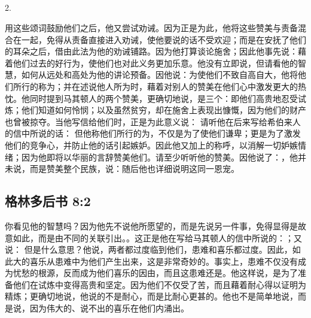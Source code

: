 
\subsection{}

2. \par

用这些颂词鼓励他们之后，他又尝试劝诫。因为正是为此，他将这些赞美与责备混合在一起，免得从责备直接进入劝诫，使他要说的话不受欢迎；而是在安抚了他们的耳朵之后，借由此法为他的劝诫铺路。因为他打算谈论施舍；因此他事先说：藉着他们过去的好行为，使他们也对此义务更加乐意。他没有立即说，但请看他的智慧，如何从远处和高处为他的讲论预备。因他说：为使他们不致自高自大，他将他们所行的称为；并在述说他人所为时，藉着对别人的赞美在他们心中激发更大的热忱。他同时提到马其顿人的两个赞美，更确切地说，是三个：即他们高贵地忍受试炼；他们知道如何怜悯；以及虽然贫穷，却在施舍上表现出慷慨，因为他们的财产也曾被掠夺。当他写信给他们时，正是为此意义说： 请听他在后来写给希伯来人的信中所说的话： 但他称他们所行的为，不仅是为了使他们谦卑；更是为了激发他们的竞争心，并防止他的话引起嫉妒。因此他又加上的称呼，以消解一切妒嫉情绪；因为他即将以华丽的言辞赞美他们。请至少听听他的赞美。因他说了：，他并未说，而是赞美整个民族，说：随后他也详细说明这同一恩宠。\par


\subsection{格林多后书 8:2}

\par

你看见他的智慧吗？因为他先不说他所愿望的，而是先说另一件事，免得显得是故意如此，而是由不同的关联引出。。这正是他在写给马其顿人的信中所说的：；又说： 但是什么意思？他说，两者都过度临到他们，患难和喜乐都过度。因此，如此大的喜乐从患难中为他们产生出来，这是非常奇妙的。事实上，患难不仅没有成为忧愁的根源，反而成为他们喜乐的因由，而且这患难还是。他这样说，是为了准备他们在试炼中变得高贵和坚定。因为他们不仅受了苦，而且藉着耐心得以证明为精炼；更确切地说，他说的不是耐心，而是比耐心更甚的。他也不是简单地说，而是说，因为伟大的、说不出的喜乐在他们内涌出。\par


